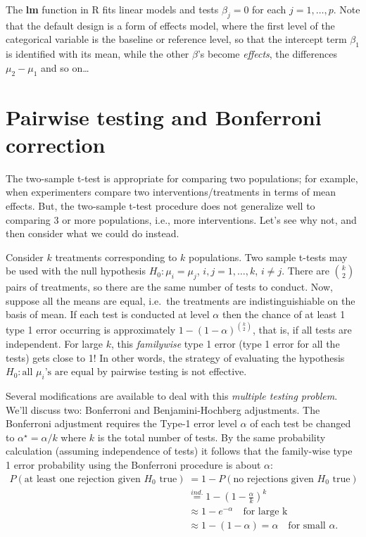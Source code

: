 \documentclass[
]{book}
\begin{document}
The \textbf{lm} function in R fits linear models and tests \(\beta_j = 0\) for each \(j=1, \ldots, p\). Note that the default design is a form of effects model, where the first level of the categorical variable is the baseline or reference level, so that the intercept term \(\beta_1\) is identified with its mean, while the other \(\beta\)'s become \emph{effects}, the differences \(\mu_2 - \mu_1\) and so on\ldots{}

\hypertarget{pairwise-testing-and-bonferroni-correction}{%
\section{Pairwise testing and Bonferroni correction}\label{pairwise-testing-and-bonferroni-correction}}

The two-sample t-test is appropriate for comparing two populations; for example, when experimenters compare two interventions/treatments in terms of mean effects. But, the two-sample t-test procedure does not generalize well to comparing 3 or more populations, i.e., more interventions. Let's see why not, and then consider what we could do instead.

Consider \(k\) treatments corresponding to \(k\) populations. Two sample t-tests may be used with the null hypothesis \(H_0:\mu_i = \mu_j\), \(i,j = 1, \ldots, k\), \(i\ne j\). There are \({k \choose 2}\) pairs of treatments, so there are the same number of tests to conduct. Now, suppose all the means are equal, i.e.~the treatments are indistinguishiable on the basis of mean. If each test is conducted at level \(\alpha\) then the chance of at least 1 type 1 error occurring is approximately \(1-(1-\alpha)^{{k \choose 2}}\), that is, if all tests are independent. For large \(k\), this \emph{familywise} type 1 error (type 1 error for all the tests) gets close to 1! In other words, the strategy of evaluating the hypothesis \(H_0:\text{all }\mu_i\text{'s are equal}\) by pairwise testing is not effective.

Several modifications are available to deal with this \emph{multiple testing problem}. We'll discuss two: Bonferroni and Benjamini-Hochberg adjustments. The Bonferroni adjustment requires the Type-1 error level \(\alpha\) of each test be changed to \(\alpha^\star = \alpha/k\) where \(k\) is the total number of tests. By the same probability calculation (assuming independence of tests) it follows that the family-wise type 1 error probability using the Bonferroni procedure is about \(\alpha\):
\begin{align*}
P(\text{at least one rejection given }H_0\text{ true}) &= 1-P(\text{no rejections given }H_0\text{ true})\\
& \stackrel{ind.}{=} 1-(1-\frac{\alpha}{k})^k\\
& \approx 1 - e^{-\alpha}\quad \text{for large k}\\
& \approx 1 - (1-\alpha) = \alpha \quad \text{for small }\alpha.
\end{align*}
\end{document}
